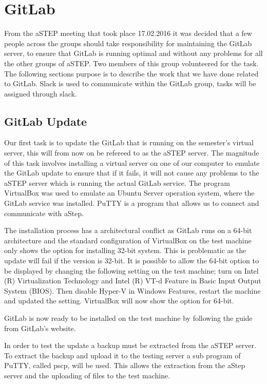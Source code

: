 \section{GitLab}
From the aSTEP meeting that took place 17.02.2016 it was decided that a few people across the groups should take responsibility for maintaining the GitLab server, to ensure that GitLab is running optimal and without any problems for all the other groups of aSTEP. Two members of this group volunteered for the task. The following sections purpose is to describe the work that we have done related to GitLab. Slack is used to communicate within the GitLab group, tasks will be assigned through slack. 

\subsection{GitLab Update}
Our first task is to update the GitLab that is running on the semester's virtual server, this will from now on be refereed to as the aSTEP server. The magnitude of this task involves installing a virtual server on one of our computer to emulate the GitLab update to ensure that if it fails, it will not cause any problems to the aSTEP server which is running the actual GitLab service. The program VirtualBox\cite{vbox} was used to emulate an Ubuntu Server operation system, where the GitLab service was installed. PuTTY\cite{putty}  is a program that allows us to connect and communicate with aStep.

The installation process has a architectural conflict as GitLab runs on a 64-bit architecture and the standard configuration of VirtualBox on the test machine only shows the option for installing 32-bit system. This is problematic as the update will fail if the version is 32-bit. It is possible to allow the 64-bit option to be displayed by changing the following setting on the test machine; turn on Intel (R) Virtualization Technology and Intel (R) VT-d Feature in Basic Input Output System (BIOS). Then disable Hyper-V in Windows Features, restart the machine and updated the setting. VirtualBox will now show the option for 64-bit. 

GitLab is now ready to be installed on the test machine by following the guide from GitLab's website\cite{gitlab_guide}.

In order to test the update a backup must be extracted from the aSTEP server. To extract the backup and upload it to the testing server a sub program of PuTTY, called pscp, will be used. This allows the extraction from the aStep server and the uploading of files to the test machine.

